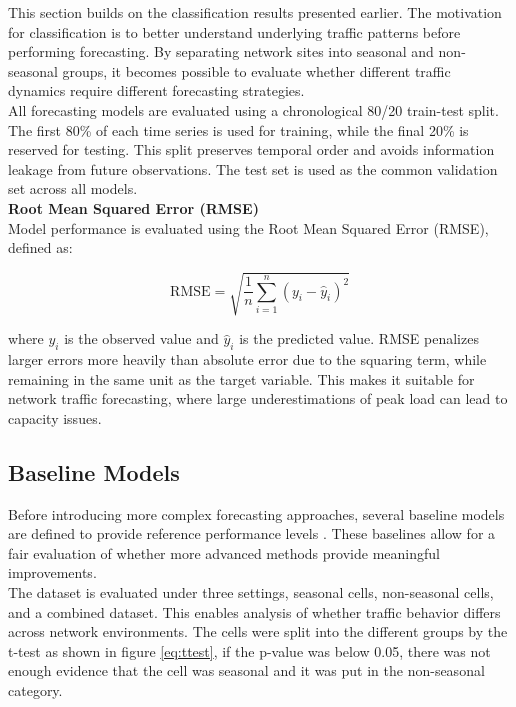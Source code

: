 This section builds on the classification results presented earlier. The motivation for classification is to better understand underlying traffic patterns before performing forecasting. By separating network sites into seasonal and non-seasonal groups, it becomes possible to evaluate whether different traffic dynamics require different forecasting strategies. \\

All forecasting models are evaluated using a chronological 80/20 train-test split. The first 80\% of each time series is used for training, while the final 20\% is reserved for testing. This split preserves temporal order and avoids information leakage from future observations. The test set is used as the common validation set across all models. \\

\textbf{Root Mean Squared Error (RMSE)} \\
Model performance is evaluated using the Root Mean Squared Error (RMSE), defined as:

\begin{equation}
	\text{RMSE} = \sqrt{\frac{1}{n} \sum_{i=1}^{n} (y_i - \hat{y}_i)^2}
	\label{eq:rmse}
\end{equation}

where $y_i$ is the observed value and $\hat{y}_i$ is the predicted value. RMSE penalizes larger errors more heavily than absolute error due to the squaring term, while remaining in the same unit as the target variable. This makes it suitable for network traffic forecasting, where large underestimations of peak load can lead to capacity issues. \\

\subsection{Baseline Models}

Before introducing more complex forecasting approaches, several baseline models are defined to provide reference performance levels \cite{forecasting_book}.  These baselines allow for a fair evaluation of whether more advanced methods provide meaningful improvements. \\

The dataset is evaluated under three settings, seasonal cells, non-seasonal cells, and a combined dataset. This enables analysis of whether traffic behavior differs across network environments. The cells were split into the different groups by the t-test as shown in figure \ref{eq:ttest}, if the p-value was below 0.05, there was not enough evidence that the cell was seasonal and it was put in the non-seasonal category.  \\

